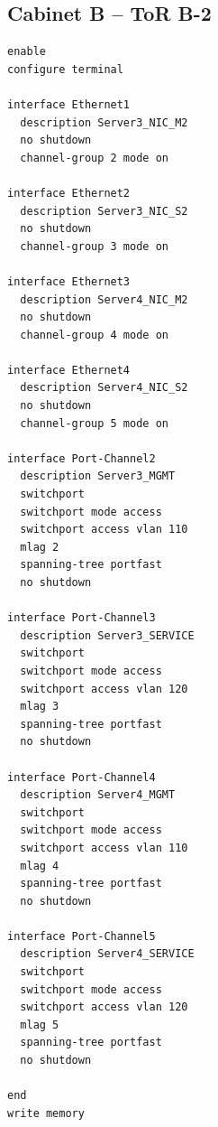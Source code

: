 \subsection{Cabinet B -- ToR B-2}
\begin{lstlisting}[caption={ToR B-2: downlinks to Servers 3 and 4 (backup NICs).},basicstyle=\ttfamily\footnotesize,breaklines=true]
enable
configure terminal

interface Ethernet1
  description Server3_NIC_M2
  no shutdown
  channel-group 2 mode on

interface Ethernet2
  description Server3_NIC_S2
  no shutdown
  channel-group 3 mode on

interface Ethernet3
  description Server4_NIC_M2
  no shutdown
  channel-group 4 mode on

interface Ethernet4
  description Server4_NIC_S2
  no shutdown
  channel-group 5 mode on

interface Port-Channel2
  description Server3_MGMT
  switchport
  switchport mode access
  switchport access vlan 110
  mlag 2
  spanning-tree portfast
  no shutdown

interface Port-Channel3
  description Server3_SERVICE
  switchport
  switchport mode access
  switchport access vlan 120
  mlag 3
  spanning-tree portfast
  no shutdown

interface Port-Channel4
  description Server4_MGMT
  switchport
  switchport mode access
  switchport access vlan 110
  mlag 4
  spanning-tree portfast
  no shutdown

interface Port-Channel5
  description Server4_SERVICE
  switchport
  switchport mode access
  switchport access vlan 120
  mlag 5
  spanning-tree portfast
  no shutdown

end
write memory
\end{lstlisting}

